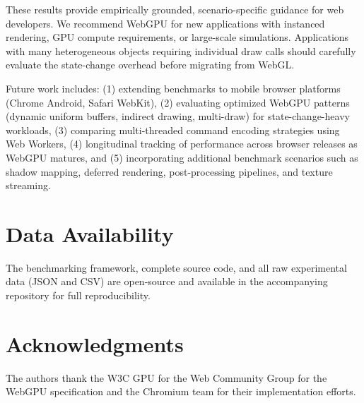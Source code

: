 \documentclass[conference]{IEEEtran}
\begin{document}
These results provide empirically grounded, scenario-specific guidance for web developers. We recommend WebGPU for new applications with instanced rendering, GPU compute requirements, or large-scale simulations. Applications with many heterogeneous objects requiring individual draw calls should carefully evaluate the state-change overhead before migrating from WebGL.

Future work includes: (1) extending benchmarks to mobile browser platforms (Chrome Android, Safari WebKit), (2) evaluating optimized WebGPU patterns (dynamic uniform buffers, indirect drawing, multi-draw) for state-change-heavy workloads, (3) comparing multi-threaded command encoding strategies using Web Workers, (4) longitudinal tracking of performance across browser releases as WebGPU matures, and (5) incorporating additional benchmark scenarios such as shadow mapping, deferred rendering, post-processing pipelines, and texture streaming.

\section*{Data Availability}

The benchmarking framework, complete source code, and all raw experimental data (JSON and CSV) are open-source and available in the accompanying repository for full reproducibility.

\section*{Acknowledgments}

The authors thank the W3C GPU for the Web Community Group for the WebGPU specification and the Chromium team for their implementation efforts.




\balance
\end{document}
